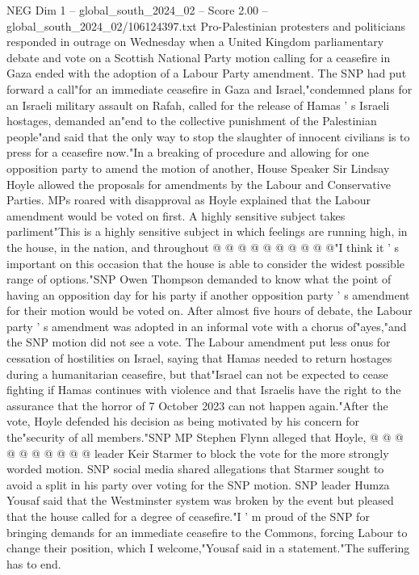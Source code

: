 \begin{textsample}{NEG Dim 1 – global\_south\_2024\_02 – Score 2.00 – global\_south\_2024\_02/106124397.txt}  \label{ex:f1_neg_428}
Pro-Palestinian protesters and politicians responded in outrage on Wednesday when a United Kingdom parliamentary debate and vote on a Scottish National Party motion calling for a ceasefire in Gaza ended with the adoption of a Labour Party amendment.
The SNP had put forward a call"for an immediate ceasefire in Gaza and Israel,"condemned plans for an Israeli military assault on Rafah, called for the release of Hamas ' s Israeli hostages, demanded an"end to the collective punishment of the Palestinian people"and said that the only way to stop the slaughter of innocent civilians is to press for a ceasefire now."In a breaking of procedure and allowing for one opposition party to amend the motion of another, House Speaker Sir Lindsay Hoyle allowed the proposals for amendments by the Labour and Conservative Parties.
MPs roared with disapproval as Hoyle explained that the Labour amendment would be voted on first.
A highly sensitive subject takes parliment"This is a highly sensitive subject in which feelings are running high, in the house, in the nation, and throughout @ @ @ @ @ @ @ @ @ @"I think it ' s important on this occasion that the house is able to consider the widest possible range of options."SNP Owen Thompson demanded to know what the point of having an opposition day for his party if another opposition party ' s amendment for their motion would be voted on.
After almost five hours of debate, the Labour party ' s amendment was adopted in an informal vote with a chorus of"ayes,"and the SNP motion did not see a vote.
The Labour amendment put less onus for cessation of hostilities on Israel, saying that Hamas needed to return hostages during a humanitarian ceasefire, but that"Israel can not be expected to cease fighting if Hamas continues with violence and that Israelis have the right to the assurance that the horror of 7 October 2023 can not happen again."After the vote, Hoyle defended his decision as being motivated by his concern for the"security of all members."SNP MP Stephen Flynn alleged that Hoyle, @ @ @ @ @ @ @ @ @ @ leader Keir Starmer to block the vote for the more strongly worded motion.
SNP social media shared allegations that Starmer sought to avoid a split in his party over voting for the SNP motion.
SNP leader Humza Yousaf said that the Westminster system was broken by the event but pleased that the house called for a degree of ceasefire."I ' m proud of the SNP for bringing demands for an immediate ceasefire to the Commons, forcing Labour to change their position, which I welcome,"Yousaf said in a statement."The suffering has to end.

\end{textsample}
